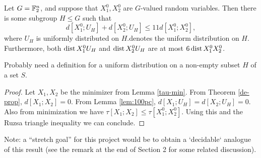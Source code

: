 \begin{theorem}\label{entropy-pfr}
  Let $G = \mathbb{F}_2^n$, and suppose that $X^0_1, X^0_2$ are $G$-valued random variables.
  Then there is some subgroup $H \leq G$ such that
  \[
    d[X^0_1;U_H] + d[X^0_2;U_H] \le 11 d[X^0_1;X^0_2],
  \]
  where $U_H$ is uniformly distributed on $H$.denotes the uniform distribution on $H$.
  Furthermore, both $\operatorname{dist}{X^0_1}{U_H}$ and $\operatorname{dist}{X^0_2}{U_H}$ are at most $6 \operatorname{dist}{X^0_1}{X^0_2}$.
\end{theorem}

Probably need a definition for a uniform distribution on a non-empty subset $H$ of a set $S$.

\begin{proof}   Let $X_1, X_2$ be the minimizer from Lemma \ref{tau-min}.  From Theorem \ref{de-prop}, $d[X_1;X_2]=0$.  From Lemma \ref{lem:100pc}, $d[X_1;U_H] = d[X_2; U_H] = 0$.  Also from minimization we have $\tau[X_1;X_2] \leq \tau[X^0_1;X^0_2]$.  Using this and the Ruzsa triangle inequality we can conclude.
\end{proof}

Note: a ``stretch goal'' for this project would be to obtain a `decidable` analogue of this result (see the remark at the end of Section 2 for some related discussion).

